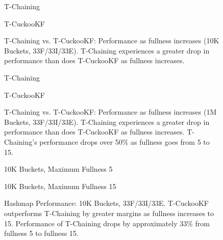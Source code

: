 \begin{figure}[H]
    \centering
    \begin{minipage}{0.7\textwidth}
    \caption*{T-Chaining}
        \vspace{12pt}
    \end{minipage}
    \begin{minipage}{0.7\textwidth}
    \caption*{T-CuckooKF}
    \end{minipage}
    \caption[T-Chaining vs. T-CuckooKF: Performance as fullness increases (10K Buckets, 33F/33I/33E)]{T-Chaining vs. T-CuckooKF: Performance as fullness increases (10K Buckets, 33F/33I/33E). T-Chaining experiences a greater drop in performance than does T-CuckooKF as fullness increases.}
    \label{fig:hm_fullness_33_1}
\end{figure}

\begin{figure}[H]
    \centering
    \begin{minipage}{0.7\textwidth}
    \caption*{T-Chaining}
        \vspace{12pt}
    \end{minipage}
    \begin{minipage}{0.7\textwidth}
    \caption*{T-CuckooKF}
    \end{minipage}
    \caption[T-Chaining vs. T-CuckooKF: Performance as fullness increases (1M Buckets, 33F/33I/33E)]{T-Chaining vs. T-CuckooKF: Performance as fullness increases (1M Buckets, 33F/33I/33E). T-Chaining experiences a greater drop in performance than does T-CuckooKF as fullness increases. T-Chaining's performance drops over 50\% as fullness goes from 5 to 15.}
    \label{fig:hm_fullness_33_2}
\end{figure}

\begin{figure}[H]
    \centering
    \begin{minipage}{0.75\textwidth}
    \caption*{10K Buckets, Maximum Fullness 5}
        \vspace{12pt}
    \end{minipage}
   \begin{minipage}{0.75\textwidth}
    \caption*{10K Buckets, Maximum Fullness 15}
    \end{minipage}
	\caption[Hashmap Performance: 10K Buckets, 33F/33I/33E]{Hashmap Performance: 10K Buckets, 33F/33I/33E. T-CuckooKF outperforms T-Chaining by greater margins as fullness increases to 15. Performance of T-Chaining drops by approximately 33\% from fullness 5 to fullness 15.}
    \label{fig:hm_33_1}
\end{figure}

